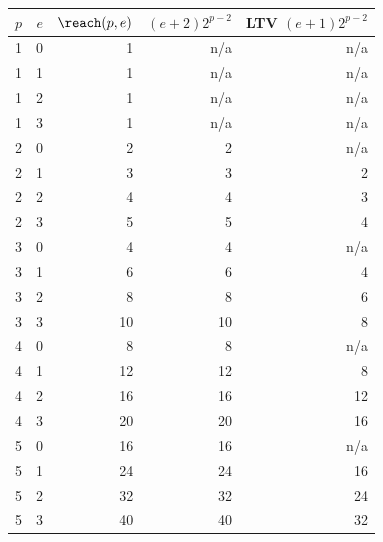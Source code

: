 
\begin{tabular}{r r r r r}
\toprule
$p$ & $e$ & $\reach(p,e)$ & $(e+2)2^{p-2}$ & LTV $(e+1)2^{p-2}$ \\
\midrule
1 & 0 & 1 & n/a & n/a \\
1 & 1 & 1 & n/a & n/a \\
1 & 2 & 1 & n/a & n/a \\
1 & 3 & 1 & n/a & n/a \\
2 & 0 & 2 & 2 & n/a \\
2 & 1 & 3 & 3 & 2 \\
2 & 2 & 4 & 4 & 3 \\
2 & 3 & 5 & 5 & 4 \\
3 & 0 & 4 & 4 & n/a \\
3 & 1 & 6 & 6 & 4 \\
3 & 2 & 8 & 8 & 6 \\
3 & 3 & 10 & 10 & 8 \\
4 & 0 & 8 & 8 & n/a \\
4 & 1 & 12 & 12 & 8 \\
4 & 2 & 16 & 16 & 12 \\
4 & 3 & 20 & 20 & 16 \\
5 & 0 & 16 & 16 & n/a \\
5 & 1 & 24 & 24 & 16 \\
5 & 2 & 32 & 32 & 24 \\
5 & 3 & 40 & 40 & 32 \\
\bottomrule
\end{tabular}
